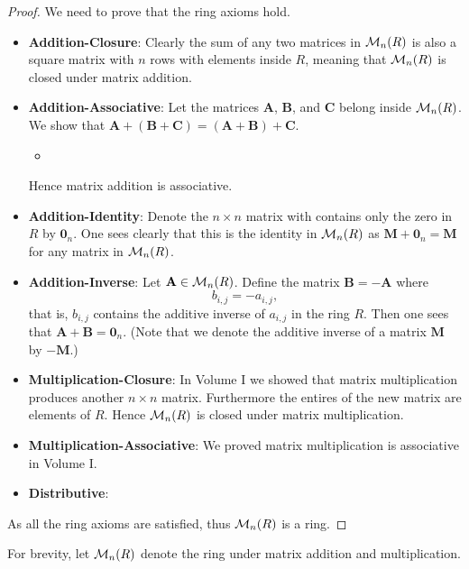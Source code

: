 \begin{proof}
    We need to prove that the ring axioms hold.
    \begin{itemize}
        \item \textbf{Addition-Closure}: Clearly the sum of any two matrices in $\mathcal{M}_{n}(R)$ is also a square matrix with $n$ rows with elements inside $R$, meaning that $\mathcal{M}_{n}(R)$ is closed under matrix addition.

        \item \textbf{Addition-Associative}: Let the matrices $\textbf{A}$, $\textbf{B}$, and $\textbf{C}$ belong inside $\mathcal{M}_{n}(R)$. We show that $\textbf{A} + (\textbf{B} + \textbf{C}) = (\textbf{A} + \textbf{B}) + \textbf{C}$.
        \begin{itemize}
            \item %
        \end{itemize}
        Hence matrix addition is associative.

        \item \textbf{Addition-Identity}: Denote the $n \times n$ matrix with contains only the zero in $R$ by $\textbf{0}_n$. One sees clearly that this is the identity in $\mathcal{M}_{n}(R)$ as $\textbf{M} + \textbf{0}_n = \textbf{M}$ for any matrix in $\mathcal{M}_{n}(R)$.
        
        \item \textbf{Addition-Inverse}: Let $\textbf{A} \in \mathcal{M}_{n}(R)$. Define the matrix $\textbf{B} = -\textbf{A}$ where
        \[
            b_{i,j} = -a_{i,j},    
        \]
        that is, $b_{i,j}$ contains the additive inverse of $a_{i,j}$ in the ring $R$. Then one sees that $\textbf{A} + \textbf{B} = \textbf{0}_n$.\newline
        (Note that we denote the additive inverse of a matrix $\textbf{M}$ by $-\textbf{M}$.)

        \item \textbf{Multiplication-Closure}: In Volume I we showed that matrix multiplication produces another $n \times n$ matrix. Furthermore the entires of the new matrix are elements of $R$. Hence $\mathcal{M}_{n}(R)$ is closed under matrix multiplication.
        
        \item \textbf{Multiplication-Associative}: We proved matrix multiplication is associative in Volume I.
        
        \item \textbf{Distributive}: %
    \end{itemize}
    As all the ring axioms are satisfied, thus $\mathcal{M}_{n}(R)$ is a ring.
\end{proof}
For brevity, let $\mathcal{M}_{n}(R)$ denote the ring under matrix addition and multiplication.

